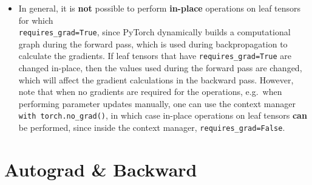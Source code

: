 \documentclass[12pt, a4paper]{scrbook}
\numberwithin{equation}{section}
\theoremstyle{definition}
\theoremstyle{definition}
\begin{document}
\begin{itemize}
		\item In general, it is \textbf{not} possible to perform \textbf{in-place} operations on leaf tensors for which \\ \texttt{requires\_grad=True}, since
		PyTorch dynamically builds a computational graph during the forward pass, which is used during backpropagation to calculate the gradients. If leaf tensors that have \texttt{requires\_grad=True} are changed in-place, then the values used during the forward pass are changed, which will affect the gradient calculations in the backward pass. However, note that when no gradients are required for the operations, e.g.~when performing parameter updates manually, one can use the context manager \texttt{with torch.no\_grad()}, in which case in-place operations on leaf tensors \textbf{can} be performed, since inside the context manager, \texttt{requires\_grad=False}.
		
	\end{itemize}		
	
	\section{Autograd \& Backward}
	
\end{document}

